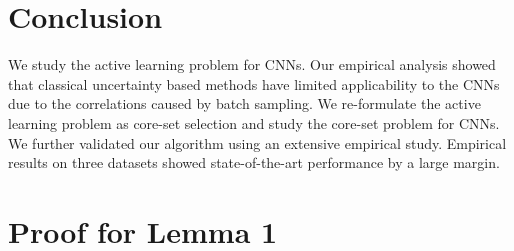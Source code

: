 \documentclass{article} %
\begin{document}
\section{Conclusion} We study the active learning problem for CNNs. Our empirical analysis showed that classical
uncertainty based methods have limited applicability to the CNNs due to the correlations caused by batch sampling. We
re-formulate the active learning problem as core-set selection and study the core-set problem for CNNs. We further
validated our algorithm using an extensive empirical study. Empirical results on three datasets showed state-of-the-art
performance by a large margin.






\appendix

\section{Proof for Lemma 1}
\end{document}
